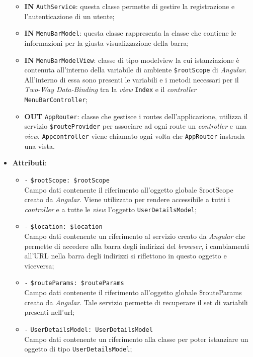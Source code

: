 \begin{itemize}
\begin{itemize}
		\item \textbf{IN} \texttt{AuthService}: questa classe permette di gestire la registrazione e l'autenticazione di un utente;
		\item \textbf{IN} \texttt{MenuBarModel}: questa classe rappresenta la classe che contiene le informazioni per la giusta visualizzazione della barra;
		\item \textbf{IN} \texttt{MenuBarModelView}: classe di tipo modelview la cui istanziazione è contenuta all'interno della variabile di ambiente \texttt{\$rootScope} di \textit{Angular}. All'interno di essa sono presenti le variabili e i metodi necessari per il \textit{Two-Way Data-Binding} tra la \textit{view} \texttt{Index} e il \textit{controller} \texttt{MenuBarController};
		\item \textbf{OUT} \texttt{AppRouter}: classe che gestisce i routes dell’applicazione, utilizza il servizio \texttt{\$routeProvider} per associare ad ogni route un \textit{controller} e una \textit{view}. \texttt{Appcontroller} viene chiamato ogni volta che \texttt{AppRouter} instrada una vista.
	\end{itemize}
	\item \textbf{Attributi}:
	\begin{itemize}
		\item \texttt{-} \texttt{\$rootScope: \$rootScope} \\
		Campo dati contenente il riferimento all'oggetto globale \$rootScope creato da \textit{Angular}. Viene utilizzato per rendere accessibile a tutti i \textit{controller} e a tutte le \textit{view} l'oggetto \texttt{UserDetailsModel};
		\item \texttt{-} \texttt{\$location: \$location} \\
		Campo dati contenente un riferimento al servizio creato da \textit{Angular} che permette di accedere alla barra degli indirizzi del \textit{browser}, i cambiamenti all'URL nella barra degli indirizzi si riflettono in questo oggetto e viceversa; 
		\item \texttt{-} \texttt{\$routeParams: \$routeParams} \\
		Campo dati contenente il riferimento all'oggetto globale \$routeParams creato da \textit{Angular}. Tale servizio permette di recuperare il set di variabili presenti nell'url;
		\item \texttt{-} \texttt{UserDetailsModel: UserDetailsModel} \\
		Campo dati contenente un riferimento alla classe per poter istanziare un oggetto di tipo \texttt{UserDetailsModel};

\end{itemize}
\end{itemize}
